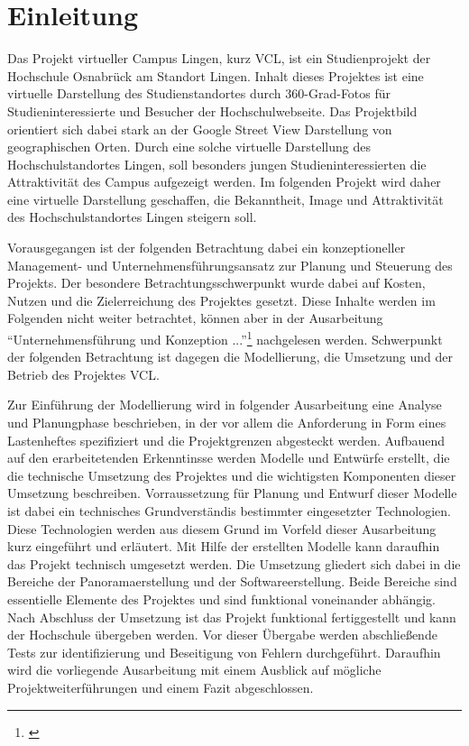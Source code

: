 \section{Einleitung}
\label{sec:Einleitung}

Das Projekt virtueller Campus Lingen, kurz VCL, ist ein Studienprojekt der Hochschule Osnabrück am Standort Lingen. Inhalt dieses Projektes ist eine virtuelle Darstellung des Studienstandortes durch 360-Grad-Fotos für Studieninteressierte und Besucher der Hochschulwebseite. Das Projektbild orientiert sich dabei stark an der Google Street View Darstellung von geographischen Orten\footnotemark. Durch eine solche virtuelle Darstellung des Hochschulstandortes Lingen, soll besonders jungen Studieninteressierten die Attraktivität des Campus aufgezeigt werden. Im folgenden Projekt wird daher eine virtuelle Darstellung geschaffen, die Bekanntheit, Image und Attraktivität des Hochschulstandortes Lingen steigern soll.


Vorausgegangen ist der folgenden Betrachtung dabei ein konzeptioneller Management- und Unternehmensführungsansatz zur Planung und Steuerung des Projekts. Der besondere Betrachtungsschwerpunkt wurde dabei auf Kosten, Nutzen und die Zielerreichung des Projektes gesetzt. Diese Inhalte werden im Folgenden nicht weiter betrachtet, können aber in der Ausarbeitung "`Unternehmensführung und Konzeption ..."'\footnote{\citet{unternehmensfuehrung2014}} nachgelesen werden. Schwerpunkt der folgenden Betrachtung ist dagegen die Modellierung, die Umsetzung und der Betrieb des Projektes VCL.

Zur Einführung der Modellierung wird in folgender Ausarbeitung eine Analyse und Planungphase beschrieben, in der vor allem die Anforderung in Form eines Lastenheftes spezifiziert und die Projektgrenzen abgesteckt werden. Aufbauend auf den erarbeitetenden Erkenntinsse werden Modelle und Entwürfe erstellt, die die technische Umsetzung des Projektes und die wichtigsten Komponenten dieser Umsetzung beschreiben. Vorraussetzung für Planung und Entwurf dieser Modelle ist dabei ein technisches Grundverständis bestimmter eingesetzter Technologien. Diese Technologien werden aus diesem Grund im Vorfeld dieser Ausarbeitung kurz eingeführt und erläutert. Mit Hilfe der erstellten Modelle kann daraufhin das Projekt technisch umgesetzt werden. Die Umsetzung gliedert sich dabei in die Bereiche der Panoramaerstellung und der Softwareerstellung. Beide Bereiche sind essentielle Elemente des Projektes und sind funktional voneinander abhängig. Nach Abschluss der Umsetzung ist das Projekt funktional fertiggestellt und kann der Hochschule übergeben werden. Vor dieser Übergabe werden abschließende Tests zur identifizierung und Beseitigung von Fehlern durchgeführt.
Daraufhin wird die vorliegende Ausarbeitung mit einem Ausblick auf mögliche Projektweiterführungen und einem Fazit abgeschlossen. 